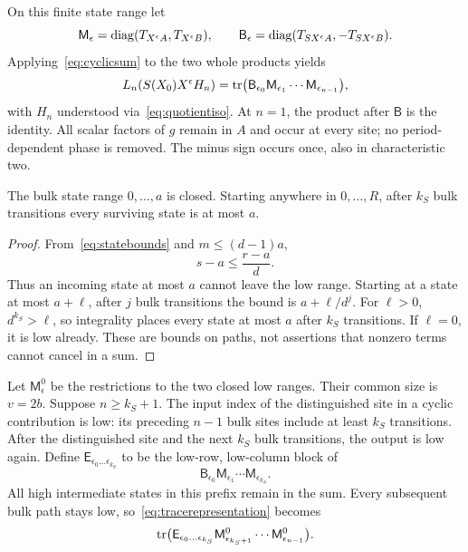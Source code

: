 On this finite state range let
\begin{equation}\label{eq:blocks}
 \mathsf M_\epsilon=\operatorname{diag}(T_{X^\epsilon A},T_{X^\epsilon B}),
 \qquad
 \mathsf B_\epsilon=\operatorname{diag}(T_{SX^\epsilon A},-T_{SX^\epsilon B}).
\end{equation}
Applying~\eqref{eq:cyclicsum} to the two whole products yields
\begin{equation}\label{eq:tracerepresentation}
 L_n(S(X_0)X^\epsilon H_n)=
 \operatorname{tr}\bigl(\mathsf B_{\epsilon_0}\mathsf M_{\epsilon_1}
                    \cdots\mathsf M_{\epsilon_{n-1}}\bigr),
\end{equation}
with $H_n$ understood via~\eqref{eq:quotientiso}. At $n=1$, the
product after $\mathsf B$ is the identity. All scalar factors of
$g$ remain in $A$ and occur at every site; no period-dependent
phase is removed. The minus sign occurs once, also in
characteristic two.

\begin{lemma}
\label{lem:contraction}
The bulk state range $0,\ldots,a$ is closed. Starting anywhere in
$0,\ldots,R$, after $k_S$ bulk transitions every surviving state
is at most $a$.
\end{lemma}
\begin{proof}
From~\eqref{eq:statebounds} and $m\le(d-1)a$,
\[
 s-a\le\frac{r-a}{d}.
\]
Thus an incoming state at most $a$ cannot leave the low range.
Starting at a state at most $a+\ell$, after $j$ bulk transitions
the bound is $a+\ell/d^j$. For $\ell>0$,
$d^{k_S}>\ell$, so integrality places every state at most $a$
after $k_S$ transitions. If $\ell=0$, it is low already. These
are bounds on paths, not assertions that nonzero terms cannot
cancel in a sum.
\end{proof}

Let $\mathsf M^0_\epsilon$ be the restrictions to the two closed
low ranges. Their common size is $v=2b$. Suppose $n\ge k_S+1$.
The input index of the distinguished site in a cyclic contribution
is low: its preceding $n-1$ bulk sites include at least $k_S$
transitions. After the distinguished site and the next $k_S$
bulk transitions, the output is low again. Define
$\mathsf E_{\epsilon_0\ldots\epsilon_{k_S}}$ to be the low-row,
low-column block of
\[
 \mathsf B_{\epsilon_0}\mathsf M_{\epsilon_1}
                    \cdots\mathsf M_{\epsilon_{k_S}}.
\]
All high intermediate states in this prefix remain in the sum.
Every subsequent bulk path stays low, so~\eqref{eq:tracerepresentation}
becomes
\begin{equation}\label{eq:prefixtrace}
 \operatorname{tr}\bigl(\mathsf E_{\epsilon_0\ldots\epsilon_{k_S}}
       \mathsf M^0_{\epsilon_{k_S+1}}\cdots
       \mathsf M^0_{\epsilon_{n-1}}\bigr).
\end{equation}

